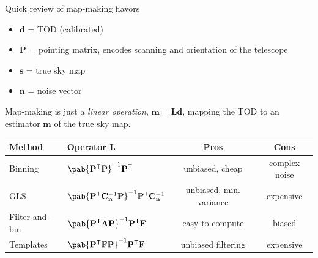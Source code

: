 \documentclass[final]{beamer}
\newcommand{\transpose}[1]{\ensuremath{#1^{\mathsf T}}}
\newlength{\colwidth}
\begin{document}
\begin{frame}[t]
\begin{columns}[t]
\begin{column}{\colwidth}
\begin{alertblock}{Quick review of map-making flavors}
        \begin{itemize}
          \item $\mathbf d$ = TOD (calibrated)
          \item $\mathbf P$ = pointing matrix, encodes scanning and orientation of the telescope
          \item $\mathbf s$ = true sky map
          \item $\mathbf n$ = noise vector
        \end{itemize}

        Map-making is just a \emph{linear operation}, \( \mathbf m = \mathbf{L d} \), mapping the TOD to an estimator $\mathbf m$ of the true sky map.

        \begin{table}
          \centering
          \begin{tabular}{l l c c}
            \toprule
            \textbf{Method} & \textbf{Operator} \(\mathbf L\)                                                                                              & \textbf{Pros}           & \textbf{Cons} \\
            \midrule
            Binning         & \( \pab{\transpose{\mathbf P} \mathbf P}^{-1} \transpose{\mathbf P} \)                                                       & unbiased, cheap         & complex noise \\
            \midrule
            GLS             & \( \pab{\transpose{\mathbf P} \mathbf{C}_\mathbf{n}^{-1} \mathbf P}^{-1} \transpose{\mathbf P} \mathbf{C}_\mathbf{n}^{-1} \) & unbiased, min. variance & expensive     \\
            \midrule
            Filter-and-bin  & \( \pab{\transpose{\mathbf P} \mathbf{\Lambda P}}^{-1} \transpose{\mathbf P} \mathbf F \)                                    & easy to compute         & biased        \\
            \midrule
            Templates       & \( \pab{\transpose{\mathbf P} \mathbf{F P}}^{-1} \transpose{\mathbf P} \mathbf F \)                                          & unbiased filtering      & expensive     \\
            \bottomrule
          \end{tabular}
        \end{table}



\end{alertblock}
\end{column}
\end{columns}
\end{frame}
\end{document}
